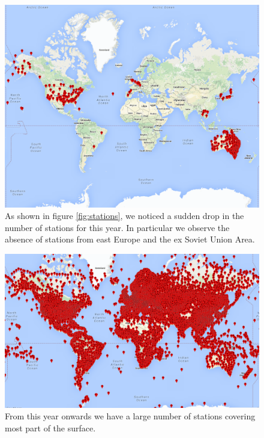 \documentclass{vldb}
\begin{document}
\begin{figure}[tbh]
\includegraphics[width=1\linewidth]{stations1972}
\caption{As shown in figure \ref{fig:stations}, we noticed a sudden drop in the number of stations for this year. In particular we observe the absence of stations from east Europe and the ex Soviet Union Area.}
\label{fig:stations1972}
\end{figure}
\begin{figure}[tbh]
\includegraphics[width=1\linewidth]{stations1980}
\caption{From this year onwards we have a large number of stations covering most part of the surface.}
\label{fig:stations1980}
\end{figure}
\end{document}
